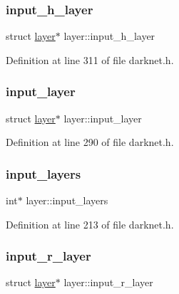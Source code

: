 \mbox{\label{structlayer_a526089c1cc0aa9d9738f3e5b8358166f}} 
\subsubsection{\texorpdfstring{input\_h\_layer}{input\_h\_layer}}
{\footnotesize\ttfamily struct \mbox{\hyperlink{structlayer}{layer}}$\ast$ layer\+::input\+\_\+h\+\_\+layer}



Definition at line 311 of file darknet.\+h.

\mbox{\label{structlayer_afcfa8ab43a850ea490c6d82ff05def87}} 
\subsubsection{\texorpdfstring{input\_layer}{input\_layer}}
{\footnotesize\ttfamily struct \mbox{\hyperlink{structlayer}{layer}}$\ast$ layer\+::input\+\_\+layer}



Definition at line 290 of file darknet.\+h.

\mbox{\label{structlayer_afd5797d71336f51f9b5b1bd1ef0bddd8}} 
\subsubsection{\texorpdfstring{input\_layers}{input\_layers}}
{\footnotesize\ttfamily int$\ast$ layer\+::input\+\_\+layers}



Definition at line 213 of file darknet.\+h.

\mbox{\label{structlayer_a7c67ff6cd710e56e2eb0da199c4d0cff}} 
\subsubsection{\texorpdfstring{input\_r\_layer}{input\_r\_layer}}
{\footnotesize\ttfamily struct \mbox{\hyperlink{structlayer}{layer}}$\ast$ layer\+::input\+\_\+r\+\_\+layer}



